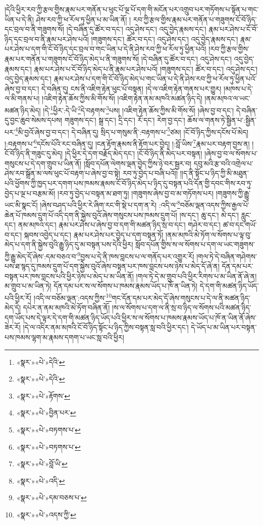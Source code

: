 །དེའི་ཕྱིར་རབ་ཀྱི་རྩལ་གྱིས་རྣམ་པར་གནོན་པ་ཕུང་པོ་ལྔ་པོ་དག་གི་མངོན་པར་འགྲུབ་པར་གཏོགས་པ་སྟོན་པ་གང་ཡིན་པ་དེ་ནི། ཤེས་རབ་ཀྱི་ཕ་རོལ་ཏུ་ཕྱིན་པ་མ་ཡིན་ནོ། །
རབ་ཀྱི་རྩལ་གྱིས་རྣམ་པར་གནོན་པ་གཟུགས་ངོ་བོ་ཉིད་དང་བྲལ་བ་ནི་གཟུགས་སོ། །དེ་བཞིན་དུ་ཚོར་བ་དང་། འདུ་ཤེས་དང་། འདུ་བྱེད་རྣམས་དང་། རྣམ་པར་ཤེས་པ་ངོ་བོ་ཉིད་དང་བྲལ་བ་ནི་རྣམ་པར་ཤེས་པའོ། །གཟུགས་དང་། ཚོར་བ་དང་། འདུ་ཤེས་དང་། འདུ་བྱེད་རྣམས་དང་། རྣམ་པར་ཤེས་པ་དག་གི་ངོ་བོ་ཉིད་དང་བྲལ་བ་གང་ཡིན་པ་དེ་ནི་ཤེས་རབ་ཀྱི་ཕ་རོལ་ཏུ་ཕྱིན་པའོ། །རབ་ཀྱི་རྩལ་གྱིས་རྣམ་པར་གནོན་པ་གཟུགས་ངོ་བོ་ཉིད་མེད་པ་ནི་གཟུགས་སོ། །དེ་བཞིན་དུ་ཚོར་བ་དང་། འདུ་ཤེས་དང་། འདུ་བྱེད་རྣམས་དང་། རྣམ་པར་ཤེས་པ་ངོ་བོ་ཉིད་མེད་པ་ནི་རྣམ་པར་ཤེས་པའོ། །གཟུགས་དང་། ཚོར་བ་དང་། འདུ་ཤེས་དང་། འདུ་བྱེད་རྣམས་དང་། རྣམ་པར་ཤེས་པ་དག་གི་ངོ་བོ་ཉིད་མེད་པ་གང་ཡིན་པ་དེ་ནི་ཤེས་རབ་ཀྱི་ཕ་རོལ་ཏུ་ཕྱིན་པའོ་ཞེས་བྱ་བ་དང་། དེ་བཞིན་དུ། ངས་ནི་འཇིག་རྟེན་ཕུང་པོ་བསྟན། །དེ་ལ་འཇིག་རྟེན་གནས་པར་གྱུར། །མཁས་པ་དེ་ལ་མི་གནས་པ། །འཇིག་རྟེན་ཆོས་ཀྱིས་མི་གོས་སོ། །འཇིག་རྟེན་ནམ་མཁའི་མཚན་ཉིད་དེ། །ནམ་མཁའ་ལ་ཡང་མཚན་ཉིད་མེད། །དེ་\footnote{«སྣར་»«པེ་»དེའི་}ཕྱིར་:དེ་ཡི་\footnote{«སྣར་»«པེ་»དེའི་}དེ་བརྟགས་\footnote{«སྣར་»«པེ་»རྟོགས་}པས། །འཇིག་རྟེན་ཆོས་ཀྱིས་མི་གོས་སོ། །ཞེས་བྱ་བ་དང་། དེ་བཞིན་དུ་བྱང་ཆུབ་སེམས་དཔས། གཟུགས་དང་། སྒྲ་དང་། དྲི་དང་། རོ་དང་། རེག་བྱ་དང་། ཆོས་ལ་གནས་ཏེ་སྦྱིན་པ་:སྦྱིན་པར་\footnote{«སྣར་»«པེ་»བྱིན་པར་}མི་བྱའོ་ཞེས་བྱ་བ་དང་། དེ་བཞིན་དུ། སྲིད་པ་གསུམ་ནི་:བརྟགས་པ་\footnote{«སྣར་»«པེ་»བཏགས་པ་}ཙམ། །ངོ་བོ་ཉིད་ཀྱིས་དངོས་པོ་མེད། །:བརྟགས་པ་\footnote{«སྣར་»«པེ་»བཏགས་པ་}དངོས་པོའི་རང་བཞིན་དུ། །ངན་རྟོག་རྣམས་ནི་རྟོག་པར་བྱེད། །:བློ་ཡིས་\footnote{«སྣར་»«པེ་»བློ་ཡི་}རྣམ་པར་བརྟག་བྱས་ན། །ངོ་བོ་ཉིད་ནི་གཟུང་དུ་མེད། །དེ་ཕྱིར་དེ་དག་བརྗོད་མེད་དང་། །ངོ་བོ་ཉིད་ནི་མེད་པར་བསྟན། །ཞེས་བྱ་བ་ལ་སོགས་པ་གསུངས་པ་དེ་དག་གྲུབ་པ་ཡིན་ནོ། །སློབ་དཔོན་ལེགས་ལྡན་བྱེད་ཀྱིས་ཉེ་བར་སྦྱར་བ། དབུ་མའི་རྩ་བའི་འགྲེལ་པ་ཤེས་རབ་སྒྲོན་མ་ལས་ཕུང་པོ་བརྟག་པ་ཞེས་བྱ་བ་སྟེ། རབ་ཏུ་བྱེད་པ་བཞི་པའོ།། །།ད་ནི་སྟོང་པ་ཉིད་ཀྱི་མི་མཐུན་པའི་ཕྱོགས་ཀྱི་ཁྱད་པར་དགག་པས་ཁམས་རྣམས་ངོ་བོ་ཉིད་མེད་པ་ཉིད་དུ་བསྟན་པའི་དོན་གྱི་དབང་གིས་རབ་ཏུ་བྱེད་པ་ལྔ་པ་བརྩམ་མོ། །རབ་ཏུ་བྱེད་པ་བསྟན་མ་ཐག་ཏུ། །གཟུགས་ཞེས་བྱ་བ་མ་གཏོགས་པར། །གཟུགས་ཀྱི་རྒྱུ་ཡང་མི་སྣང་ངོ། །ཞེས་བཤད་པའི་ཕྱིར་རེ་ཞིག་རང་གི་སྡེ་པ་དག་ན་རེ། :འདི་ལ་\footnote{«སྣར་»«པེ་»འདི་}བཅོམ་ལྡན་འདས་ཀྱིས་རྒྱལ་པོ་ཆེན་པོ་ཁམས་དྲུག་པོ་འདི་དག་ནི་སྐྱེས་བུའོ་ཞེས་གསུངས་པས་ཁམས་དྲུག་པོ། །ས་དང་། ཆུ་དང་། མེ་དང་། རླུང་དང་། ནམ་མཁའ་དང་། རྣམ་པར་ཤེས་པ་ཞེས་བྱ་བ་དག་གི་མཚན་ཉིད་སྲ་བ་དང་། གཤེར་བ་དང་། ཚ་བ་དང་གཡོ་བ་དང་། སྐབས་འབྱེད་པ་དང་། རྣམ་པར་ཤེས་པར་བྱེད་པ་དག་བསྟན་ཏོ། །ནམ་མཁའི་མེ་ཏོག་ལ་སོགས་པ་ལྟ་བུ་མེད་པ་དག་ནི་སྐྱེས་བུའི་རྒྱུ་ཉིད་དུ་མ་བསྟན་པས་དེའི་ཕྱིར། སློབ་དཔོན་གྱིས་ས་ལ་སོགས་པ་དག་ལ་ཡང་གཟུགས་ཀྱི་རྒྱུ་མེད་དོ་ཞེས་:དམ་བཅའ་བ་\footnote{«སྣར་»«པེ་»དམ་བཅས་པ་}བྱས་པ་དེ་ནི་ཁས་བླངས་པ་ལ་གནོད་པར་འགྱུར་རོ། །གལ་ཏེ་དེ་བཞིན་གཤེགས་པས་ཐ་སྙད་དུ་ཁམས་དྲུག་པོ་དག་སྐྱེས་བུའོ་ཞེས་བསྟན་པར་ཁས་བླངས་པས་ཉེས་པ་མེད་དོ་ཞེ་ན། དོན་དམ་པར་བསྟན་པར་ཁས་བླངས་པའི་ཕྱིར་ཉེས་པ་མེད་པ་མ་ཡིན་ནོ། །གལ་ཏེ་དེ་མ་གྲུབ་པའི་ཕྱིར་རིགས་པ་མ་ཡིན་ནོ་ཞེ་ན། མ་གྲུབ་པ་མ་ཡིན་ཏེ། དོན་དམ་པར་ས་ལ་སོགས་པ་ཁམས་རྣམས་ཡོད་པ་ཁོ་ན་ཡིན་ཏེ། དེ་དག་གི་མཚན་ཉིད་ཡོད་པའི་ཕྱིར་རོ། །འདི་ལ་བཅོམ་ལྡན་:འདས་ཀྱིས་\footnote{«སྣར་»«པེ་»འདས་ཀྱི་}གང་དོན་དམ་པར་མེད་དོ་ཞེས་གསུངས་པ་དེ་ལ་ནི་མཚན་ཉིད་མེད་དེ། དཔེར་ན་ནམ་མཁའི་མེ་ཏོག་བཞིན་ནོ། །ས་ལ་སོགས་པ་དག་ལ་ནི་སྲ་བ་ཉིད་ལ་སོགས་པའི་མཚན་ཉིད་དག་ཡོད་པས་དེ་ལྟར་དེ་དག་གི་མཚན་ཉིད་ཡོད་པའི་ཕྱིར་ས་ལ་སོགས་པ་ཁམས་རྣམས་ཡོད་པ་ཁོ་ན་ཡིན་ནོ་ཞེས་ཟེར་རོ། །དེ་ལ་འདིར་ནམ་མཁའི་ངོ་བོ་ཉིད་སྟོང་པ་ཉིད་ཀྱིས་བསྟན་སླ་བའི་ཕྱིར་དང་། དེ་ཡོད་པ་མ་ཡིན་པར་བསྟན་པས་ཁམས་ལྷག་མ་རྣམས་དགག་པ་ཡང་སླ་བའི་ཕྱིར། 